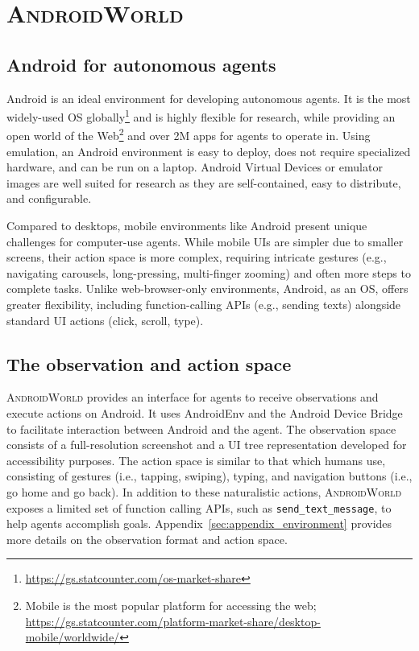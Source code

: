 \documentclass{article}
\newcommand{\system}{\textsc{AndroidWorld}\xspace}
\begin{document}
\section{\system}
\label{sec:androidworld}

\subsection{Android for autonomous agents}

Android is an ideal environment for developing autonomous agents. It is the most widely-used OS globally\footnote{\url{https://gs.statcounter.com/os-market-share}} and is highly flexible for research, while providing an open world of the Web\footnote{Mobile is the most popular platform for accessing the web; \url{https://gs.statcounter.com/platform-market-share/desktop-mobile/worldwide/}} and over 2M apps for agents to operate in. Using emulation, an Android environment is easy to deploy, does not require specialized hardware, and can be run on a laptop. Android Virtual Devices or emulator images are well suited for research as they are self-contained, easy to distribute, and configurable.

Compared to desktops, mobile environments like Android present unique challenges for computer-use agents. While mobile UIs are simpler due to smaller screens, their action space is more complex, requiring intricate gestures (e.g., navigating carousels, long-pressing, multi-finger zooming) and often more steps to complete tasks. Unlike web-browser-only environments, Android, as an OS, offers greater flexibility, including function-calling APIs (e.g., sending texts) alongside standard UI actions (click, scroll, type).
\vspace{-.5em}
\subsection{The observation and action space}
\system provides an interface for agents to receive observations and execute actions on Android. It uses AndroidEnv \citep{android_env} and the Android Device Bridge to facilitate interaction between Android and the agent. The observation space consists of a full-resolution screenshot and a UI tree representation developed for accessibility purposes. The action space is similar to that which humans use, consisting of gestures (i.e., tapping, swiping), typing, and navigation buttons (i.e., go home and go back). In addition to these naturalistic actions, \system exposes a limited set of function calling APIs, such as \texttt{send\_text\_message}, to help agents accomplish goals. Appendix~\ref{sec:appendix_environment} provides more details on the observation format and action space.
\end{document}
